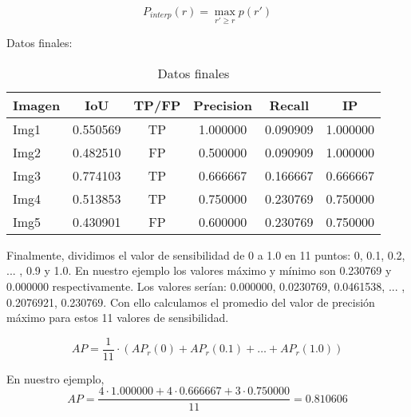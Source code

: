 \[P_{interp}(r) = \max_{r'\geq r} p(r')\]

\newpage

Datos finales:

\begin{table}[h]
	\begin{center}
		\begin{tabular}{l | c c c c c}
			Imagen & IoU & TP/FP & Precision & Recall & IP\\ \hline
			Img1 & 0.550569 & TP & 1.000000 & 0.090909 & 1.000000\\
			Img2 & 0.482510 & FP & 0.500000 & 0.090909 & 1.000000\\
			Img3 & 0.774103 & TP & 0.666667 & 0.166667 & 0.666667\\
			Img4 & 0.513853 & TP & 0.750000 & 0.230769 & 0.750000\\
			Img5 & 0.430901 & FP & 0.600000 & 0.230769 & 0.750000\\
		\end{tabular}
		\caption{Datos finales}
		\label{datosfinales}
	\end{center}
\end{table}

Finalmente, dividimos el valor de sensibilidad de 0 a 1.0 en 11 puntos: 0, 0.1, 0.2, ... , 0.9 y 1.0. En nuestro ejemplo los valores máximo y mínimo son 0.230769 y 0.000000 respectivamente. Los valores serían: 0.000000, 0.0230769, 0.0461538, ... , 0.2076921, 0.230769. Con ello calculamos el promedio del valor de precisión máximo para estos 11 valores de sensibilidad.

\[AP = \frac{1}{11} \cdot (AP_{r}(0) + AP_{r}(0.1) + \ldots + AP_{r}(1.0))\]

En nuestro ejemplo,
\[AP = \frac{4 \cdot 1.000000 + 4 \cdot 0.666667 + 3 \cdot 0.750000}{11} = 0.810606\]